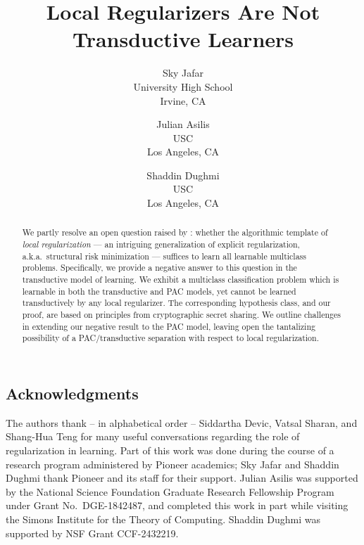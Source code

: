 \documentclass[11pt]{article}
\title{Local Regularizers Are Not Transductive Learners}
\author{
Sky Jafar \\ University High School \\ Irvine, CA \\ 
\email{jafar.sky@gmail.com} \and 
Julian Asilis \\ USC \\ Los Angeles, CA \\ \email{asilis@usc.edu} \and 
Shaddin Dughmi \\ USC  \\ Los Angeles, CA \\ \email{shaddin@usc.edu} 
}
\date{}
\begin{document}
\maketitle

\begin{abstract}
We partly resolve an open question raised by \citet[COLT 2024]{asilis2024regularization,asilis-open-problem}: whether the algorithmic template of \emph{local regularization} --- an intriguing generalization of explicit regularization, a.k.a.~structural risk minimization --- suffices to learn all learnable multiclass problems. Specifically, we provide a negative answer to this question in the transductive model of learning. We exhibit a multiclass classification problem which is learnable in both the transductive and PAC models, yet cannot be learned transductively by any local regularizer. The corresponding hypothesis class, and our proof, are based on principles from cryptographic secret sharing. We outline challenges in extending our negative result to the PAC model, leaving open the tantalizing possibility of a PAC/transductive separation with respect to local regularization.
\end{abstract}













\vspace{-0.2 cm}
\subsection*{Acknowledgments}
\vspace{-0.2 cm}

\noindent 
The authors thank -- in alphabetical order -- Siddartha Devic, Vatsal Sharan, and Shang-Hua Teng for many useful conversations regarding the role of regularization in learning. 
Part of this work was done during the course of a research program administered by Pioneer academics; Sky Jafar and Shaddin Dughmi thank Pioneer and its staff for their support.
Julian Asilis was supported by the National Science Foundation Graduate Research Fellowship Program under Grant No.\ DGE-1842487, and completed this work in part while visiting the Simons Institute for the Theory of Computing.
Shaddin Dughmi was supported by NSF Grant CCF-2432219. 

\newpage 


\end{document}
